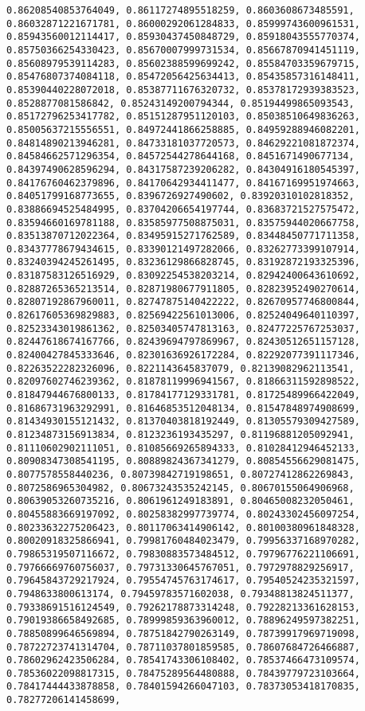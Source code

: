 \documentclass[11pt]{article}
\begin{document}
\begin{Verbatim}[commandchars=\\\{\}]
0.86208540853764049, 0.86117274895518259, 0.8603608673485591, 0.86032871221671781, 0.86000292061284833, 0.85999743600961531, 0.85943560012114417, 0.85930437450848729, 0.85918043555770374, 0.85750366254330423, 0.85670007999731534, 0.85667870941451119, 0.85608979539114283, 0.85602388599699242, 0.85584703359679715, 0.85476807374084118, 0.85472056425634413, 0.85435857316148411, 0.85390440228072018, 0.85387711676320732, 0.85378172939383523, 0.8528877081586842, 0.85243149200794344, 0.85194499865093543, 0.85172796253417782, 0.85151287951120103, 0.85038510649836263, 0.85005637215556551, 0.84972441866258885, 0.84959288946082201, 0.84814890213946281, 0.84733181037720573, 0.84629221081872374, 0.84584662571296354, 0.84572544278644168, 0.8451671490677134, 0.84397490628596294, 0.84317587239206282, 0.84304916180545397, 0.84176760462379896, 0.84170642934411477, 0.84167169951974663, 0.84051799168773655, 0.8396726927490602, 0.83920310102818352, 0.83886694525484995, 0.83704206654197744, 0.83683721527575472, 0.83594660169781188, 0.83585977508875031, 0.83575944020667758, 0.83513870712022364, 0.83495915271762589, 0.83448450771711358, 0.83437778679434615, 0.83390121497282066, 0.83262773399107914, 0.83240394245261495, 0.83236129866828745, 0.83192872193325396, 0.83187583126516929, 0.83092254538203214, 0.82942400643610692, 0.82887265365213514, 0.82871980677911805, 0.82823952490270614, 0.82807192867960011, 0.82747875140422222, 0.82670957746800844, 0.82617605369829883, 0.82569422561013006, 0.82524049640110397, 0.82523343019861362, 0.82503405747813163, 0.82477225767253037, 0.82447618674167766, 0.82439694797869967, 0.82430512651157128, 0.82400427845333646, 0.82301636926172284, 0.82292077391117346, 0.82263522282326096, 0.8221143645837079, 0.82139082962113541, 0.82097602746239362, 0.81878119996941567, 0.81866311592898522, 0.81847944676800133, 0.81784177129331781, 0.81725489966422049, 0.81686731963292991, 0.81646853512048134, 0.81547848974908699, 0.81434930155121432, 0.81370403818192449, 0.81305579309427589, 0.81234873156913834, 0.8123236193435297, 0.81196881205092941, 0.81110602902111051, 0.81085669265894333, 0.81028412946452133, 0.80908347308541195, 0.80889824367341279, 0.80854556629081475, 0.8077578558440236, 0.80739842719198651, 0.80727412862269843, 0.8072586965304982, 0.80673243535242145, 0.80670155064906968, 0.80639053260735216, 0.8061961249183891, 0.80465008232050461, 0.80455883669197092, 0.80258382997739774, 0.80243302456097254, 0.80233632275206423, 0.80117063414906142, 0.80100380961848328, 0.80020918325866941, 0.79981760484023479, 0.79956337168970282, 0.79865319507116672, 0.79830883573484512, 0.79796776221106691, 0.79766669760756037, 0.79731330645767051, 0.7972978829256917, 0.79645843729217924, 0.79554745763174617, 0.79540524235321597, 0.7948633800613174, 0.79459783571602038, 0.79348813824511377, 0.79338691516124549, 0.79262178873314248, 0.79228213361628153, 0.79019386658492685, 0.78999859363960012, 0.78896249597382251, 0.78850899646569894, 0.78751842790263149, 0.78739917969719098, 0.78722723741314704, 0.78711037801859585, 0.78607684726466887, 0.78602962423506284, 0.78541743306108402, 0.78537466473109574, 0.78536022098817315, 0.78475289564480888, 0.78439779723103664, 0.78417444433878858, 0.78401594266047103, 0.78373053418170835, 0.78277206141458699, 
\end{Verbatim}
\end{document}

